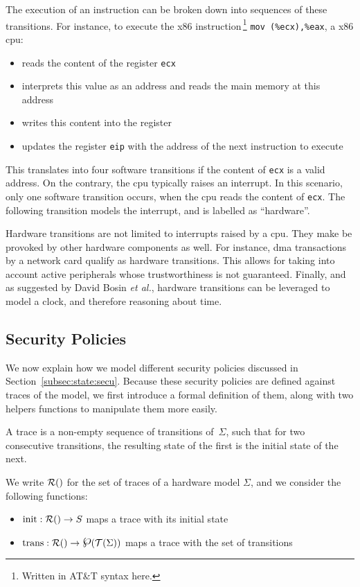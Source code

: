 The execution of an instruction can be broken down into sequences of these
transitions.
%
For instance, to execute the x86 instruction\,\footnote{Written in AT\&T syntax
  here.} \texttt{mov (\%ecx),\%eax}, a x86 \ac{cpu}:
%
\begin{itemize}
\item reads the content of the register \texttt{ecx}
%
\item interprets this value as an address and reads the main memory at this
  address
%
\item writes this content into the register 
%
\item updates the register \texttt{eip} with the address of the next instruction
  to execute
\end{itemize}

This translates into four software transitions if the content of \texttt{ecx}
is a valid address.
%
On the contrary, the \ac{cpu} typically raises an interrupt.
%
In this scenario, only one software transition occurs, when the \ac{cpu} reads
the content of \texttt{ecx}.
%
The following transition models the interrupt, and is labelled as ``hardware''.

Hardware transitions are not limited to interrupts raised by a \ac{cpu}.
%
They make be provoked by other hardware components as well.
%
For instance, \ac{dma} transactions by a network card qualify as hardware
transitions.
%
This allows for taking into account active peripherals whose trustworthiness is
not guaranteed.
%
Finally, and as suggested by David Bosin \emph{et al.}, hardware transitions can
be leveraged to model a clock, and therefore reasoning about time.

\subsection{Security Policies}
\label{subsec:speccert:security}

We now explain how we model different security policies discussed in
Section~\ref{subsec:state:secu}.
%
Because these security policies are defined against traces of the model, we
first introduce a formal definition of them, along with two helpers functions to
manipulate them more easily.

\begin{definition}[Traces]
  \label{def:speccert:trace}
  A trace is a non-empty sequence of transitions of~$\Sigma$, such that for two
  consecutive transitions, the resulting state of the first is the initial state
  of the next.

  We write $\pathesLTS{Ez}$ for the set of traces of a hardware model $\Sigma$,
  and we consider the following functions:
  \begin{itemize}
  \item $\func{init} : \pathesLTS{Ez} \rightarrow S$ maps a trace with its
    initial state
  \item
    $\func{trans} : \pathesLTS{Ez} \rightarrow \powerset(\mathcal{T}(\Sigma))$
    maps a trace with the set of transitions
  \end{itemize}
\end{definition}

